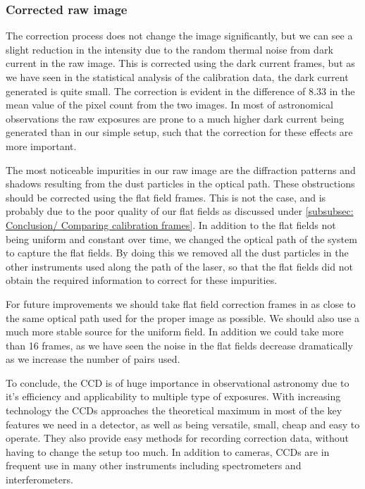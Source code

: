 \documentclass{emulateapj}
\begin{document}
\subsubsection{Corrected raw image}
The correction process does not change the image significantly, but we can see a slight reduction in the intensity due to the random thermal noise from dark current in the raw image. This is corrected using the dark current frames, but as we have seen in the statistical analysis of the calibration data, the dark current generated is quite small. The correction is evident in the difference of $8.33$ in the mean value of the pixel count from the two images. In most of astronomical observations the raw exposures are prone to a much higher dark current being generated than in our simple setup, such that the correction for these effects are more important.

The most noticeable impurities in our raw image are the diffraction patterns and shadows resulting from the dust particles in the optical path. These obstructions should be corrected using the flat field frames. This is not the case, and is probably due to the poor quality of our flat fields as discussed under \cref{subsubsec: Conclusion/ Comparing calibration frames}. In addition to the flat fields not being uniform and constant over time, we changed the optical path of the system to capture the flat fields. By doing this we removed all the dust particles in the other instruments used along the path of the laser, so that the flat fields did not obtain the required information to correct for these impurities.

For future improvements we should take flat field correction frames in as close to the same optical path used for the proper image as possible. We should also use a much more stable source for the uniform field. In addition we could take more than 16 frames, as we have seen the noise in the flat fields decrease dramatically as we increase the number of pairs used.
\medskip

To conclude, the CCD is of huge importance in observational astronomy due to it's efficiency and applicability to multiple type of exposures. With increasing technology the CCDs approaches the theoretical maximum in most of the key features we need in a detector, as well as being versatile, small, cheap and easy to operate. They also provide easy methods for recording correction data, without having to change the setup too much. In addition to cameras, CCDs are in frequent use in many other instruments including spectrometers and interferometers.
\end{document}
